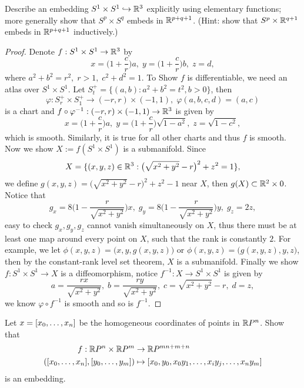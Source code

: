 \begin{pro}%
	Describe an embedding $S^1\times S^1\hookrightarrow \mathbb{R}^3$ explicitly using elementary functions; more generally show that $S^p\times S^q$ embeds in $\mathbb{R}^{p+q+1}$. (Hint: show that $S^p\times \mathbb{R}^{q+1}$ embeds in $\mathbb{R}^{p+q+1}$ inductively.)
\end{pro}
\begin{proof}
	Denote $f:S^1\times S^1\to \mathbb{R}^3$ by
	\[x=\big(1+\frac{c}{r}\big)a,\;y=\big(1+\frac{c}{r}\big)b,\;z=d,\]
	where $a^2+b^2=r^2,\; r>1,\; c^2+d^2=1$. To Show $f$ is differentiable, we need an atlas over $S^1\times S^1$. Let $S_t^+=\{(a,b):a^2+b^2=t^2,b>0\}$, then 
	\[\varphi: S_r^+\times S_1^+\to (-r,r)\times (-1,1),\; \varphi(a,b,c,d)=(a,c)\]
	is a chart and $f\circ \varphi^{-1}: (-r,r)\times (-1,1)\to \mathbb{R}^3$ is given by
	\[x=\big(1+\frac{c}{r}\big)a,\;y=\big(1+\frac{c}{r}\big)\sqrt{1-a^2},\;z=\sqrt{1-c^2},\]
	which is smooth. Similarly, it is true for all other charts and thus $f$ is smooth. Now we show $X:=f(S^1\times S^1)$ is a submanifold. Since 
	\[X=\{(x,y,z)\in \mathbb{R}^3: \big(\sqrt{x^2+y^2}-r\big)^2+z^2=1\},\]
	we define $g(x,y,z)=\big(\sqrt{x^2+y^2}-r\big)^2+z^2-1$ near $X$, then $g(X)\subset \mathbb{R}^2\times 0$. Notice that
	\[g_x=8\Big(1-\frac{r}{\sqrt{x^2+y^2}}\Big)x,\;g_y=8\Big(1-\frac{r}{\sqrt{x^2+y^2}}\Big)y,\; g_z=2z,\]
	easy to check $g_x,g_y,g_z$ cannot vanish simultaneously on $X$, thus there must be at least one map around every point on $X$, such that the rank is constantly $2$. For example, we let $\phi(x,y,z)=\big(x,y,g(x,y,z)\big)$ or $\phi(x,y,z)=\big(g(x,y,z),y,z\big)$, then by the constant-rank level set theorem, $X$ is a submanifold. Finally we show $f:S^1\times S^1\to X$ is a diffeomorphism, notice $f^{-1}:X\to S^1\times S^1$ is given by
	\[a=\frac{rx}{\sqrt{x^2+y^2}},\;b=\frac{ry}{\sqrt{x^2+y^2}},\; c=\sqrt{x^2+y^2}-r,\;
	d=z,\]
	we know $\varphi\circ f^{-1}$ is smooth and so is $f^{-1}$.
\end{proof}
\begin{pro}%
	Let $x=[x_0,\ldots,x_n]$ be the homogeneous coordinates of points in $\mathbb{R}P^n$. Show that
	\begin{align*}
		f:\mathbb{R}P^n\times \mathbb{R}P^m&\to \mathbb{R}P^{mn+m+n}\\
		([x_0,\ldots,x_n],[y_0,\ldots,y_m])&\mapsto [x_0,y_0,x_0y_1,\dots,x_iy_j,\dots,x_ny_m]
	\end{align*}
	is an embedding.
\end{pro}

